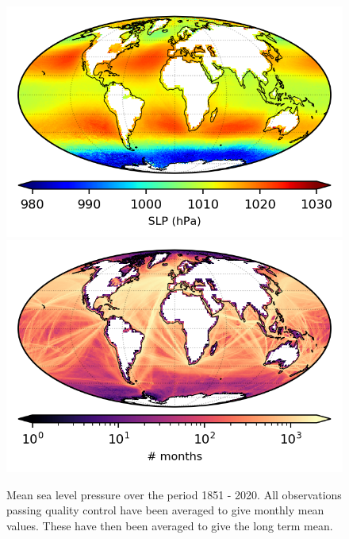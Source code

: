 \begin{figure}[h]
    \includegraphics{resources/observations-slp-mean-map-optimal.png}
    \includegraphics{resources/observations-slp-months-map-optimal.png}    
    \caption{Mean sea level pressure over the period 1851 - 2020. All observations passing quality control have been averaged to give monthly mean values. These have then been averaged to give the long term mean.}
    \label{fig:slp-map}
\end{figure}
\FloatBarrier

